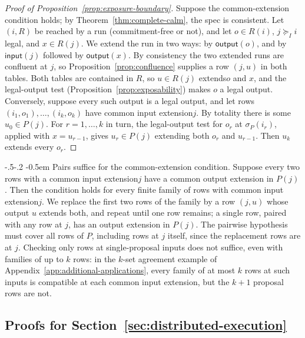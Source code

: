 \documentclass[sigconf]{cidr-2027}
\makeatletter
\theoremstyle{remark}
\renewcommand\paragraph{\@startsection{paragraph}{4}{\z@}%
  {-.5\baselineskip \@plus -2\p@ \@minus -.2\p@}%
  {-0.5em}%
  {\normalfont\bfseries}}
\newcommand{\InputGe}{\succeq_I}
\newcommand{\commitment}{commitment\xspace}
\newcommand{\indesc}{input extension\xspace} %
\newcommand{\outrel}{extends\xspace}          %
\newcommand{\outrelpart}{extending\xspace}    %
\newcommand{\outnoun}{output extension\xspace}%
\newcommand{\fiber}[1]{P(#1)}
\makeatother
\begin{document}
\color{blue!70!black}\begin{proof}[Proof of Proposition~\ref{prop:exposure-boundary}]
Suppose the common-extension condition holds; by Theorem~\ref{thm:complete-calm}, the
spec is consistent.  Let $(i,R)$ be reached by a run (\commitment-free or not), and let $o\in R(i)$, $j\InputGe i$ legal, and
$x\in R(j)$.  We extend the run in two ways: by $\mathsf{output}(o)$, and by
$\mathsf{input}(j)$ followed by $\mathsf{output}(x)$.
By consistency the two extended runs are confluent at $j$, so
Proposition~\ref{prop:confluence} supplies a row $(j,u)$ in both tables.  Both
tables are contained in $R$, so $u\in R(j)$ \outrel $o$ and $x$, and the legal-output test
(Proposition~\ref{prop:exposability}) makes $o$ a legal output.
Conversely, suppose every such output is a legal output, and let rows
$(i_1,o_1),\ldots,(i_k,o_k)$ have common \indesc $j$.  By totality there is some
$u_0\in P(j)$.  For $r=1,\ldots,k$ in turn, the legal-output test for $o_r$ at
$\sigma_P(i_r)$, applied with $x=u_{r-1}$, gives $u_r\in P(j)$ \outrelpart both
$o_r$ and $u_{r-1}$.  Then $u_k$ \outrel every $o_r$.\color{black}
\end{proof}

\paragraph{Pairs suffice for the common-extension condition.}
\label{app:pairs-suffice}
\color{blue!70!black}Suppose every two rows with a common \indesc $j$ have a common \outnoun in
$\fiber{j}$.  Then the condition holds for every finite family of rows with
common \indesc $j$.  We replace the first two rows of the family by a row
$(j,u)$ whose output $u$ \outrel both, and repeat until one row remains; a
single row, paired with any row at $j$, has an \outnoun in $\fiber{j}$.  The
pairwise hypothesis must cover all rows of $P$, including rows at $j$ itself,
since the replacement rows are at $j$.  Checking only rows at single-proposal
inputs does not suffice, even with families of up to $k$ rows: in the $k$-set agreement example of
Appendix~\ref{app:additional-applications}, every family of at most $k$ rows
at such inputs is compatible at each common \indesc, but the $k+1$ proposal
rows are not.\color{black}

\subsection{Proofs for Section~\ref{sec:distributed-execution}}
\label{app:proofs-sec4}
\end{document}
